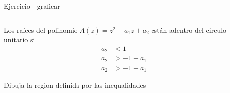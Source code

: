 \documentclass[presentation,aspectratio=169]{beamer}
\begin{document}
\begin{frame}[label={sec:org1c4a47e}]{Ejercicio - graficar}
\begin{columns}
\begin{column}{0.5\columnwidth}
Los raíces del polinomio \(A(z) = z^2 + a_1z + a_2\) están adentro del circulo unitario si
\begin{align*}
a_2 &< 1\\
a_2 &> -1+a_1\\
a_2 &> -1 - a_1
\end{align*}

\alert{Dibuja la region definida por las inequalidades}
\end{column}
\begin{column}{0.5\columnwidth}
\begin{center}
\end{center}
\end{column}
\end{columns}
\end{frame}
\end{document}
